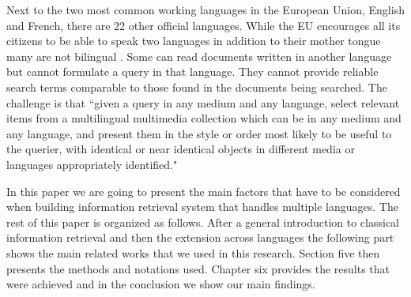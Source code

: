 \documentclass[journal]{IEEEtran}
\begin{document}
Next to the two most common working languages in the European Union, English and French, there are 22 other official languages.
While the EU encourages all its citizens to be able to speak two languages in addition to their mother tongue many are not bilingual \cite{ebs386}.
Some can read documents written in another language but cannot formulate a query in that language.
They cannot provide reliable search terms comparable to those found in the documents being searched.
The challenge is that ``given a query in any medium and any language, select relevant items from a multilingual multimedia collection which can be in any medium and any language, and present them in the style or order most likely to be useful to the querier, with identical or near identical objects in different media or languages appropriately identified." \cite{oard97a}

In this paper we are going to present the main factors that have to be considered when building information retrieval system that handles multiple languages.
The rest of this paper is organized as follows.
After a general introduction to classical information retrieval and then the extension across languages the following part shows the main related works that we used in this research.
Section five then presents the methods and notations used.
Chapter six provides the results that were achieved and in the conclusion we show our main findings.
\end{document}
